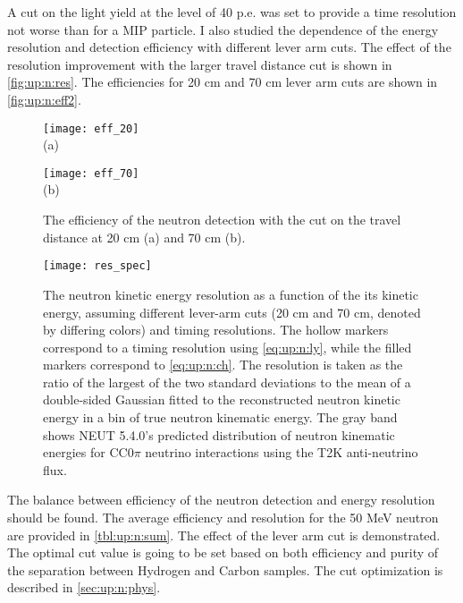 \documentclass[main.tex]{subfiles}
\begin{document}
A cut on the light yield at the level of 40 p.e. was set to provide a time resolution not worse than for a MIP particle. I also studied the dependence of the energy resolution and detection efficiency with different lever arm cuts. The effect of the resolution improvement with the larger travel distance cut is shown in \autoref{fig:up:n:res}. The efficiencies for 20 cm and 70 cm lever arm cuts are shown in \autoref{fig:up:n:eff2}.

\begin{figure}[!ht]
	\centering
	\begin{minipage}{0.49\linewidth}
		\centering
		\texttt{[image: eff\_20]} \\ (a)
	\end{minipage}
	\begin{minipage}{0.49\linewidth}
		\centering
		\texttt{[image: eff\_70]} \\ (b)
	\end{minipage}
	\caption{The efficiency of the neutron detection with the cut on the travel distance at 20 cm (a) and 70 cm (b).}
	\label{fig:up:n:eff2}
\end{figure}

\begin{figure}[!ht]
	\centering
	\texttt{[image: res\_spec]}
	\caption{The neutron kinetic energy resolution as a function of the its kinetic energy, assuming different lever-arm cuts (20 cm and 70 cm, denoted by differing colors) and timing resolutions. The hollow markers correspond to a timing resolution using \autoref{eq:up:n:ly}, while the filled markers correspond to \autoref{eq:up:n:ch}. The resolution is taken as the ratio of the largest of the two standard deviations to the mean of a double-sided Gaussian fitted to the reconstructed neutron kinetic energy in a bin of true neutron kinematic energy. The gray band shows NEUT 5.4.0’s predicted distribution of neutron kinematic energies for CC0$\pi$ neutrino interactions using the T2K anti-neutrino flux.}
	\label{fig:up:n:res}
\end{figure}

The balance between efficiency of the neutron detection and energy resolution should be found. The average efficiency and resolution for the 50 MeV neutron are provided in \autoref{tbl:up:n:sum}. The effect of the lever arm cut is demonstrated. The optimal cut value is going to be set based on both efficiency and purity of the separation between Hydrogen and Carbon samples. The cut optimization is described in \autoref{sec:up:n:phys}.
\end{document}
